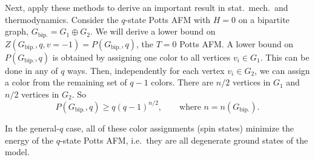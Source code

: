 Next, apply these methods to derive an important result in stat.\ mech.\ and thermodynamics.
Consider the $q$-state Potts AFM with $H = 0$ on a bipartite graph,
$G_{\text{bip.}} = G_1\oplus G_2$. We will derive a lower bound on
$Z(G_{\text{bip.}},q,v=-1) = P(G_{\text{bip.}},q)$, the $T = 0$ Potts AFM. A lower bound on
$P(G_{\text{bip.}},q)$ is obtained by assigning one color to all vertices $v_i\in G_1$. This can
be done in any of $q$ ways. Then, independently for each vertex $v_i\in G_2$, we can assign a
color from the remaining set of $q-1$ colors. There are $n/2$ vertices in $G_1$ and
$n/2$ vertices in $G_2$. So
\begin{equation}
  P(G_{\text{bip.}},q)\ge q(q-1)^{n/2},\qquad\text{where } n = n(G_{\text{bip.}}).
\end{equation}

\begin{diagram}
\end{diagram}

In the general-$q$ case, all of these color assignments (spin states) minimize the energy of the
$q$-state Potts AFM, i.e.\ they are all degenerate ground states of the model.

